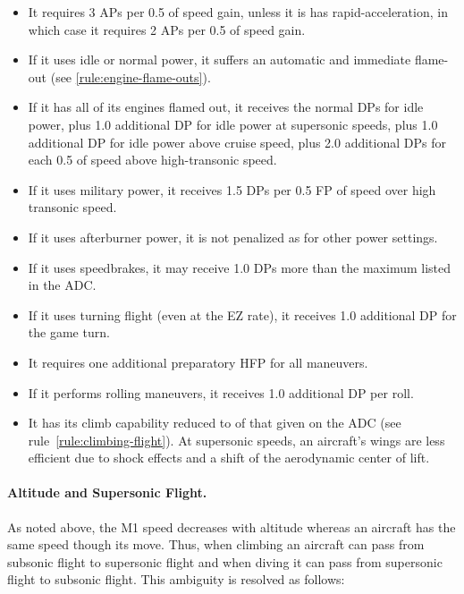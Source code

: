 \begin{advancedrules}
{\begin{itemize}
   \item It requires 3 APs per 0.5 of speed gain, unless it is has rapid-acceleration, in which case it requires 2 APs per 0.5 of speed gain.

    \item If it uses idle or normal power, it suffers an automatic and immediate flame-out (see \ref{rule:engine-flame-outs}).

    \item If it has all of its engines flamed out, it receives the normal DPs for idle power, plus 1.0 additional DP for idle power at supersonic speeds, plus 1.0 additional DP for idle power above cruise speed, plus 2.0 additional DPs for each 0.5 of speed above high-transonic speed.
   
    \item If it uses military power, it receives 1.5 DPs per 0.5 FP of speed over high transonic speed.

    \item If it uses afterburner power, it is not penalized as for other power settings.

    \item If it uses speedbrakes, it may receive 1.0 DPs more than the maximum listed in the ADC.

    \item If it uses turning flight (even at the EZ rate), it receives 1.0 additional DP for the game turn.

    \item It requires one additional preparatory HFP for all maneuvers. 

    \item If it performs rolling maneuvers, it receives 1.0 additional DP per roll.

    \item It has its climb capability reduced to {\twothirds} of that given on the ADC (see rule~\ref{rule:climbing-flight}). At supersonic speeds, an aircraft's wings are less efficient due to shock effects and a shift of the aerodynamic center of lift.

\end{itemize}
\paragraph{Altitude and Supersonic Flight.}
As noted above, the M1 speed decreases with altitude whereas an aircraft has the same speed though its move. Thus, when climbing an aircraft can pass from subsonic flight to supersonic flight and when diving it can pass from supersonic flight to subsonic flight. This ambiguity is resolved as follows:

}
\end{advancedrules}
